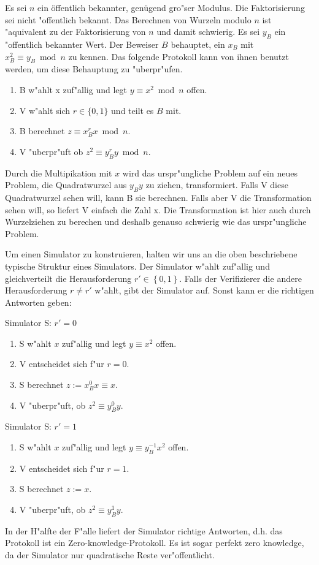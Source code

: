 \begin{beispiel}
Es sei $n$ ein \"offentlich bekannter, ge\-n\"u\-gend gro"ser Modulus. 
Die Faktorisierung
sei nicht "offentlich bekannt. Das Berechnen von Wurzeln modulo $n$
ist "aquivalent zu der Faktorisierung von $n$ und damit schwierig. Es
sei $y_B$ ein "offentlich bekannter Wert. Der Beweiser $B$ behauptet, ein
$x_B$ mit $x_B^2 \equiv y_B \bmod n$ zu kennen.  Das folgende
Protokoll kann von ihnen benutzt werden, um diese Behauptung zu
"uberpr"ufen.
\begin{enumerate}
   \item B w"ahlt x zuf"allig und legt $y \equiv x^2 \bmod n$ offen.
   \item V w"ahlt sich $r \in \{ 0,1 \}$ und teilt es $B$ mit.
   \item B berechnet  $z \equiv x_B^r x \bmod n$.
   \item V "uberpr"uft ob $z^2 \equiv y_B^r y \bmod n$.
\end{enumerate}
Durch die Multipikation mit $x$ wird das urspr"ungliche Problem auf
ein neues Problem, die Quadratwurzel aus $y_B y$ zu ziehen,
transformiert. Falls V diese Quadratwurzel sehen will, kann B sie
berechnen. Falls aber V die Transformation sehen will, so liefert V
einfach die Zahl x. Die Transformation ist hier auch durch
Wurzelziehen zu berechen und deshalb genauso schwierig wie das
urspr"ungliche Problem.

Um einen Simulator zu konstruieren, halten wir uns an die oben 
beschriebene typische Struktur eines Simulators. Der Simulator w"ahlt 
zuf"allig und gleichverteilt die Herausforderung $r'\in\left\{0,1\right\}$. 
Falls der Verifizierer die andere Herausforderung $r\neq r'$ w"ahlt, gibt der 
Simulator auf. Sonst kann er die richtigen Antworten geben:

Simulator S: $r'=0$
\begin{enumerate}
  \item S w"ahlt $x$ zuf"allig und legt $y\equiv x^2$ offen.
  \item V entscheidet sich f"ur $r=0$.
  \item S berechnet $z:=x_B^0 x \equiv x$.
  \item V "uberpr"uft, ob $z^2\equiv y_B^0 y$.
\end{enumerate}
Simulator S: $r'=1$
\begin{enumerate}
  \item S w"ahlt $x$ zuf"allig und legt $y\equiv y_B^{-1} x^2$ offen.
  \item V entscheidet sich f"ur $r=1$.
  \item S berechnet $z:=x$.
  \item V "uberpr"uft, ob $z^2\equiv y_B^1 y$.
\end{enumerate}

In der H"alfte der F"alle liefert der Simulator richtige Antworten, d.h.
das Protokoll ist ein Zero-knowledge-Protokoll. Es ist sogar perfekt
zero knowledge, da der Simulator nur quadratische Reste ver"offentlicht.
\end{beispiel}
